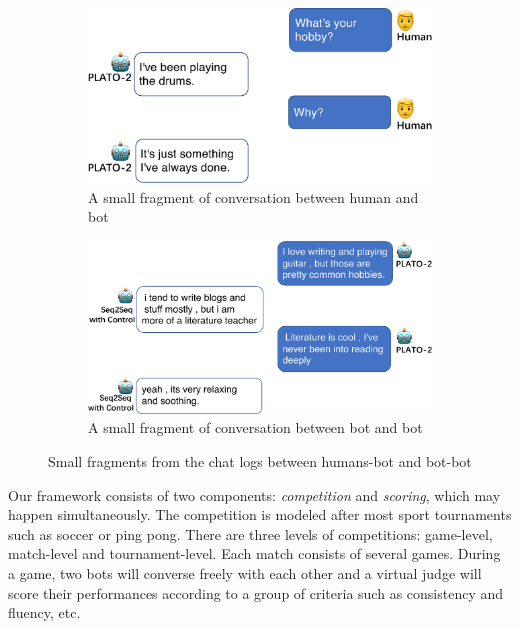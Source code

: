\begin{figure}[ht!]
\begin{subfigure}{0.5\textwidth}
  \centering
  \includegraphics[width=.8\linewidth]{crop1.eps}  
  \caption{A small fragment of conversation between human and bot}
  \label{fig:sub-first}
\end{subfigure}
\begin{subfigure}{0.5\textwidth}
  \centering
  \includegraphics[width=\linewidth]{crop2.eps}  
  \caption{A small fragment of conversation between bot and bot%
}
  \label{fig:sub-second}
\end{subfigure}
\caption{Small fragments from the chat logs between humans-bot and bot-bot}
\label{fig:two convs}
\end{figure}

Our framework consists of two components: \textit{competition} and 
\textit{scoring}, which may happen simultaneously. The competition is modeled
after most sport tournaments such as soccer or ping pong. 
There are three levels of competitions: 
game-level, match-level and tournament-level. 
Each match consists of several games. During a game, two bots will converse 
freely with each other and a virtual judge will score their performances according to
a group of criteria such as consistency and fluency, etc. 

